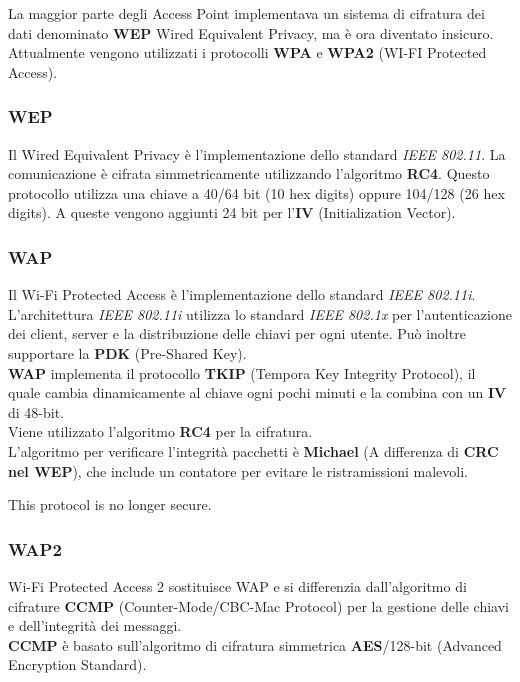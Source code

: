 \documentclass[a4paper]{article}
\begin{document}
La maggior parte degli Access Point implementava un sistema di cifratura dei dati denominato
\textbf{WEP} Wired Equivalent Privacy, ma è ora diventato insicuro.
Attualmente vengono utilizzati i protocolli \textbf{WPA} e \textbf{WPA2} (WI-FI Protected Access).

\subsubsection{WEP}

Il Wired Equivalent Privacy è l'implementazione dello standard \textit{IEEE 802.11}.
La comunicazione è cifrata simmetricamente utilizzando l'algoritmo \textbf{RC4}.
Questo protocollo utilizza una chiave a 40/64 bit (10 hex digits) oppure 104/128 (26 hex digits).
A queste vengono aggiunti 24 bit per l'\textbf{IV} (Initialization Vector). 

\subsubsection{WAP}

Il Wi-Fi Protected Access è l'implementazione dello standard \textit{IEEE 802.11i}.
L'architettura \textit{IEEE 802.11i} utilizza lo standard \textit{IEEE 802.1x} per l'autenticazione
dei client, server e la distribuzione delle chiavi per ogni utente.
Può inoltre supportare la \textbf{PDK} (Pre-Shared Key).
\\
\textbf{WAP} implementa il protocollo \textbf{TKIP} (Tempora Key Integrity Protocol), il quale
cambia dinamicamente al chiave ogni pochi minuti e la combina con un \textbf{IV} di 48-bit.
\\
Viene utilizzato l'algoritmo \textbf{RC4} per la cifratura.
\\
L'algoritmo per verificare l'integrità pacchetti è \textbf{Michael} (A differenza di \textbf{CRC nel WEP}),
che include un contatore per evitare le ristramissioni malevoli.

This protocol is no longer secure.

\subsubsection{WAP2}

Wi-Fi Protected Access 2 sostituisce WAP e si differenzia dall'algoritmo di cifrature \textbf{CCMP}
(Counter-Mode/CBC-Mac Protocol) per la gestione delle chiavi e dell'integrità dei messaggi.
\\
\textbf{CCMP} è basato sull'algoritmo di cifratura simmetrica \textbf{AES}/128-bit (Advanced Encryption Standard).
\end{document}
